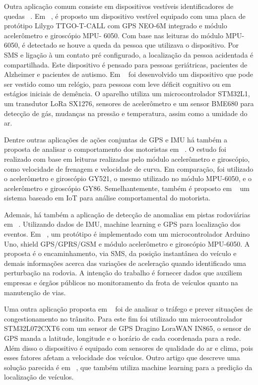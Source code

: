 Outra aplicação comum consiste em dispositivos vestíveis identificadores de quedas ~\cite{Manu2021, Yulastri2023, Hsieh2020}. Em ~\cite{Manu2021}, é proposto um dispositivo vestível equipado com uma placa de protótipo Lilygo TTGO-T-CALL com GPS NEO-6M integrado e módulo acelerômetro e giroscópio MPU- 6050. Com base nas leituras do módulo MPU-6050, é detectado se houve a queda da pessoa que utilizava o dispositivo. Por SMS e ligação à um contato pré configurado, a localização da pessoa acidentada é compartilhada. Este dispositivo é pensado para pessoas geriátricas, pacientes de Alzheimer e pacientes de autismo. Em ~\cite{requejo2023} foi desenvolvido um dispositivo que pode ser vestido como um relógio, para pessoas com leve déficit cognitivo ou em estágios iniciais de demência. O aparelho utiliza um microcontrolador STM32L1, um transdutor LoRa SX1276, sensores de acelerômetro e um sensor BME680 para detecção de gás, mudanças na pressão e temperatura, assim como a umidade do ar.

Dentre outras aplicações de ações conjuntas de GPS e IMU há também a proposta de analisar o comportamento dos motoristas em ~\cite{Ayat2021}. O estudo foi realizado com base em leituras realizadas pelo módulo acelerômetro e giroscópio, como velocidade de frenagem e velocidade de curva. Em comparação, foi utilizado o acelerômetro e giroscópio GY521, o mesmo utilizado no módulo MPU-6050, e o acelerômetro e giroscópio GY86. Semelhantemente, também é proposto em ~\cite{mohammed2023intelligent} um sistema baseado em IoT para análise comportamental do motorista.

Ademais, há também a aplicação de detecção de anomalias em pistas rodoviárias em ~\cite{Tripathi2023, Trindade2015}. Utilizando dados de IMU, machine learning e GPS para localização dos eventos. Em ~\cite{Trindade2015}, um protótipo é implementado com um microcontrolador Arduino Uno, shield GPS/GPRS/GSM e módulo acelerômetro e giroscópio MPU-6050. A proposta é o encaminhamento, via SMS, da posição instantânea do veículo e demais informações acerca das variações de aceleração quando identificado uma perturbação na rodovia. A intenção do trabalho é fornecer dados que auxiliem empresas e órgãos públicos no monitoramento da frota de veículos quanto na manutenção de vias. 

Uma outra aplicação proposta em ~\cite{priya2023} foi de analisar o tráfego e prever situações de congestionamento no trânsito. Para este fim foi utilizado um microcontrolador STM32L072CXT6 com um sensor de GPS Dragino LoraWAN IN865, o sensor de GPS manda a latitude, longitude e o horário de cada coordenada para a rede. Além disso o dispositivo é equipado com sensores de qualidade do ar e clima, pois esses fatores afetam a velocidade dos veículos. Outro artigo que descreve uma solução parecida é em ~\cite{molina2023}, que também utiliza machine learning para a predição da localização de veículos.

